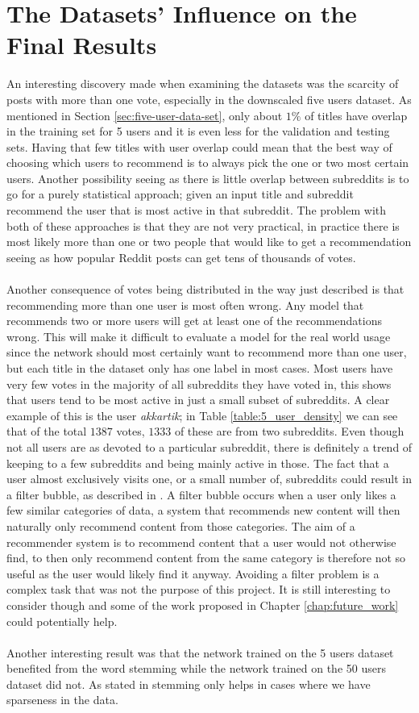 \section{The Datasets' Influence on the Final Results}\label{sec:dataset}
An interesting discovery made when examining the datasets was the scarcity of posts with more than one vote, especially in the downscaled five users dataset. As mentioned in Section  \ref{sec:five-user-data-set}, only about $1\%$ of titles have overlap in the training set for 5 users and it is even less for the validation and testing sets. Having that few titles with user overlap could mean that the best way of choosing which users to recommend is to always pick the one or two most certain users. Another possibility seeing as there is little overlap between subreddits is to go for a purely statistical approach; given an input title and subreddit recommend the user that is most active in that subreddit. The problem with both of these approaches is that they are not very practical, in practice there is most likely more than one or two people that would like to get a recommendation seeing as how popular Reddit posts can get tens of thousands of votes.
\\\\
Another consequence of votes being distributed in the way just described is that recommending more than one user is most often wrong. Any model that recommends two or more users will get at least one of the recommendations wrong. This will make it difficult to evaluate a model for the real world usage since the network should most certainly want to recommend more than one user, but each title in the dataset only has one label in most cases. Most users have very few votes in the majority of all subreddits they have voted in, this shows that users tend to be most active in just a small subset of subreddits. A clear example of this is the user \textit{akkartik}; in Table \ref{table:5_user_density} we can see that of the total $1387$ votes, $1333$ of these are from two subreddits. Even though not all users are as devoted to a particular subreddit, there is definitely a trend of keeping to a few subreddits and being mainly active in those. The fact that a user almost exclusively visits one, or a small number of, subreddits could result in a filter bubble, as described in \cite{pariser2011filter}. A filter bubble occurs when a user only likes a few similar categories of data, a system that recommends new content will then naturally only recommend content from those categories. The aim of a recommender system is to recommend content that a user would not otherwise find, to then only recommend content from the same category is therefore not so useful as the user would likely find it anyway. Avoiding a filter problem is a complex task that was not the purpose of this project. It is still interesting to consider though and some of the work proposed in Chapter \ref{chap:future_work} could potentially help.
\\\\
Another interesting result was that the network trained on the 5 users dataset benefited from the word stemming while the network trained on the 50 users dataset did not. As stated in \parencite{JONTAHANS STANDFORD SORUCE} stemming only helps in cases where we have sparseness in the data.
